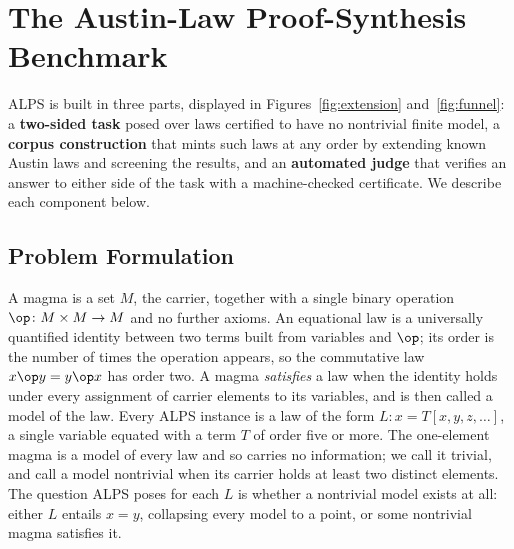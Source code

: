 
\section{The Austin-Law Proof-Synthesis Benchmark}

ALPS is built in three parts, displayed in Figures~\ref{fig:extension}
and~\ref{fig:funnel}: a \textbf{two-sided task} posed over laws certified to
have no nontrivial finite model, a \textbf{corpus construction} that mints such
laws at any order by extending known Austin laws and screening the results, and
an \textbf{automated judge} that verifies an answer to either side of the task
with a machine-checked certificate. We describe each component below.

\subsection{Problem Formulation}

A magma is a set $M$, the carrier, together with a single binary operation
${\op}\colon M \times M \to M$ and no further axioms. An equational law is a
universally quantified identity between two terms built from variables and
$\op$; its order is the number of times the operation appears, so the
commutative law $x \op y = y \op x$ has order two. A magma \emph{satisfies} a
law when the identity holds under every assignment of carrier elements to its
variables, and is then called a model of the law. Every ALPS instance is a law
of the form $L\colon x = T[x, y, z, \dots]$, a single variable equated with a
term $T$ of order five or more. The one-element magma is a model of every law
and so carries no information; we call it trivial, and call a model nontrivial
when its carrier holds at least two distinct elements. The question ALPS poses
for each $L$ is whether a nontrivial model exists at all: either $L$ entails
$x = y$, collapsing every model to a point, or some nontrivial magma satisfies
it.

